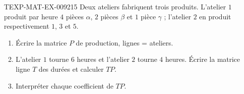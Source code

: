 \begin{exercice}{TEXP-MAT-EX-009}{2}{15}
Deux ateliers fabriquent trois produits. L'atelier $1$ produit par heure
$4$ pièces $\alpha$, $2$ pièces $\beta$ et $1$ pièce $\gamma$ ; l'atelier $2$
en produit respectivement $1$, $3$ et $5$.
\begin{enumerate}
  \item Écrire la matrice $P$ de production, lignes = ateliers.
  \item L'atelier $1$ tourne $6$ heures et l'atelier $2$ tourne $4$ heures.
        Écrire la matrice ligne $T$ des durées et calculer $TP$.
  \item Interpréter chaque coefficient de $TP$.
\end{enumerate}
\end{exercice}

